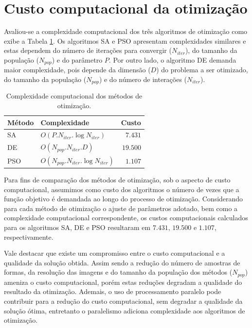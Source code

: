 \section{Custo computacional da otimização \label{sec:comp_cost}}


 Avaliou-se a complexidade computacional dos três algoritmos de otimização como exibe a Tabela \ref{tbl:complexity}.  Os algoritmos \gls{SA} e \gls{PSO} apresentam complexidades similares e estas dependem do número de iterações para convergir ($N_{iter}$), do tamanho da população  ($N_{pop}$) e do parâmetro $P$.  Por outro lado, o algoritmo \gls{DE} demanda maior complexidade, pois depende da dimensão ($D$) do problema a ser otimizado, do tamanho da população ($N_{pop}$) e do número de interações ($N_{iter}$).

\begin{table}[h!]
\centering
\caption{Complexidade computacional dos métodos de otimização.}
\label{tbl:complexity}
  \begin{tabular}{llr}
  \toprule[1.5pt]
 Método & Complexidade& Custo\\
 \midrule
   SA  & $O(P.N_{iter}.\log{N_{iter}})$ & $7.431$    \\
   DE  & $O(N_{pop}.N_{iter}.D)$ & $19.500$  \\
   PSO&  $O(N_{pop}.N_{iter}.\log{N_{iter}})$ & $1.107$\\
  \bottomrule[1.5pt]
  \end{tabular}
\end{table}

Para fins de comparação dos métodos de otimização, sob o aspecto de custo computacional, assumimos como custo dos algoritmos o número de vezes que a função objetivo é demandada ao longo do processo de otimização. Considerando para cada método de otimização o ajuste de parâmetros adotado, bem como a complexidade computacional correspondente, os custos computacionais calculados para os algoritmos \gls{SA}, \gls{DE} e \gls{PSO} resultaram em $7.431$, $19.500$ e $1.107$, respectivamente. 

Vale destacar que existe um compromisso entre o custo computacional e a qualidade da solução obtida. Assim sendo a redução do número de amostras de formas, da resolução das imagens e do tamanho da população dos métodos ($N_{pop}$) ameniza o custo computacional, porém estas reduções degradam a qualidade do resultado da otimização. Ademais, o uso de processamento paralelo pode contribuir para a redução do custo computacional, sem degradar a qualidade da solução ótima, entretanto o paralelismo adiciona complexidade aos algoritmos de otimização. 



